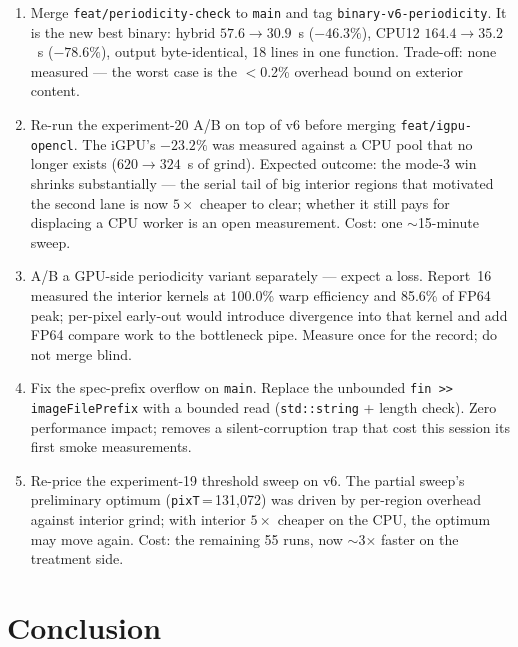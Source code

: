 \documentclass[
	english,
	letterpaper, oneside
]{article}
\begin{document}
\begin{enumerate}
  \item Merge \texttt{feat/periodicity-check} to \texttt{main} and tag
        \texttt{binary-v6-periodicity}. It is the new best binary: hybrid
        $57.6 \to 30.9$~s ($-46.3\%$), CPU12 $164.4 \to 35.2$~s ($-78.6\%$),
        output byte-identical, 18 lines in one function. Trade-off: none
        measured --- the worst case is the $<$0.2\% overhead bound on
        exterior content.
  \item Re-run the experiment-20 A/B on top of v6 before merging
        \texttt{feat/igpu-opencl}. The iGPU's $-23.2\%$ was measured against
        a CPU pool that no longer exists ($620 \to 324$~s of grind). Expected
        outcome: the mode-3 win shrinks substantially --- the serial tail of
        big interior regions that motivated the second lane is now $5\times$
        cheaper to clear; whether it still pays for displacing a CPU worker
        is an open measurement. Cost: one $\sim$15-minute sweep.
  \item A/B a GPU-side periodicity variant separately --- expect a
        loss. Report~16 measured the interior kernels at 100.0\% warp
        efficiency and 85.6\% of FP64 peak; per-pixel early-out would
        introduce divergence into that kernel and add FP64 compare work to
        the bottleneck pipe. Measure once for the record; do not merge
        blind.
  \item Fix the spec-prefix overflow on \texttt{main}. Replace the
        unbounded \texttt{fin >{}> imageFilePrefix} with a bounded read
        (\texttt{std::string} + length check). Zero performance impact;
        removes a silent-corruption trap that cost this session its first
        smoke measurements.
  \item Re-price the experiment-19 threshold sweep on v6. The
        partial sweep's preliminary optimum (\texttt{pixT}\,=\,131{,}072)
        was driven by per-region overhead against interior grind; with
        interior $5\times$ cheaper on the CPU, the optimum may move again.
        Cost: the remaining 55 runs, now $\sim$3$\times$ faster on the
        treatment side.
\end{enumerate}

\section{Conclusion}
\label{sec:conclusion}
\end{document}
